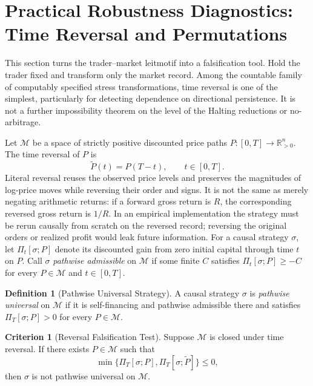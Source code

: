 \documentclass[aps,pra,reprint,superscriptaddress,amsmath,amssymb,floatfix]{revtex4-2}
\theoremstyle{plain}
\theoremstyle{definition}
\newtheorem{definition}{Definition}
\newtheorem{criterion}{Criterion}
\theoremstyle{remark}
\begin{document}
\section{Practical Robustness Diagnostics: Time Reversal and Permutations}
\label{sec:criterion}

This section turns the trader--market leitmotif into a falsification tool. Hold
the trader fixed and transform only the market record. Among the countable
family of computably specified stress transformations, time reversal is one of
the simplest, particularly for detecting dependence on directional
persistence. It is not a further impossibility theorem on the level of the
Halting reductions or no-arbitrage.

Let \(\mathcal{M}\) be a space of strictly positive discounted price paths
\(P\colon[0,T]\to\mathbb{R}_{>0}^n\). The time reversal of \(P\) is
\begin{equation}
  \widetilde{P}(t)=P(T-t), \qquad t\in[0,T].
  \label{eq:timereversal}
\end{equation}
Literal reversal reuses the observed price levels and preserves the magnitudes
of log-price moves while reversing their order and signs. It is not the same
as merely negating arithmetic returns: if a forward gross return is \(R\), the
corresponding reversed gross return is \(1/R\). In an empirical implementation
the strategy must be rerun causally from scratch on the reversed record;
reversing the original orders or realized profit would leak future information.
For a causal strategy \(\sigma\), let \(\Pi_t[\sigma;P]\) denote its discounted
gain from zero initial capital through time \(t\) on \(P\). Call \(\sigma\)
\emph{pathwise admissible} on \(\mathcal M\) if some finite \(C\) satisfies
\(\Pi_t[\sigma;P]\geq-C\) for every \(P\in\mathcal M\) and
\(t\in[0,T]\).

\begin{definition}[Pathwise Universal Strategy]
\label{def:universal}
  A causal strategy \(\sigma\) is \emph{pathwise universal} on
  \(\mathcal{M}\) if it is self-financing and pathwise admissible there and
  satisfies \(\Pi_T[\sigma;P]>0\) for every \(P\in\mathcal{M}\).
\end{definition}

\begin{criterion}[Reversal Falsification Test]
  \label{crit:tr}
  Suppose \(\mathcal{M}\) is closed under time reversal. If there exists
  \(P\in\mathcal{M}\) such that
  \begin{equation}
    \min\{\Pi_T[\sigma;P],\Pi_T[\sigma;\widetilde P]\}\leq 0,
    \label{eq:reversaltest}
  \end{equation}
  then \(\sigma\) is not pathwise universal on \(\mathcal{M}\).
\end{criterion}
\end{document}
